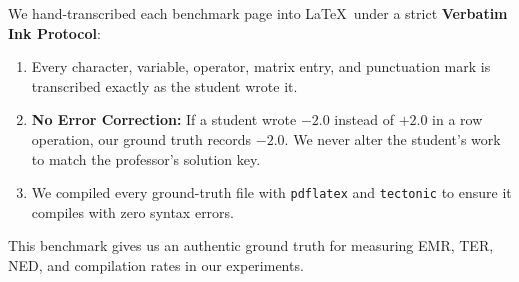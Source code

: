 We hand-transcribed each benchmark page into \LaTeX\ under a strict \textbf{Verbatim Ink Protocol}:
\begin{enumerate}
    \item Every character, variable, operator, matrix entry, and punctuation mark is transcribed exactly as the student wrote it.
    \item \textbf{No Error Correction:} If a student wrote $-2.0$ instead of $+2.0$ in a row operation, our ground truth records $-2.0$. We never alter the student's work to match the professor's solution key.
    \item We compiled every ground-truth file with \texttt{pdflatex} and \texttt{tectonic} to ensure it compiles with zero syntax errors.
\end{enumerate}
This benchmark gives us an authentic ground truth for measuring EMR, TER, NED, and compilation rates in our experiments.
